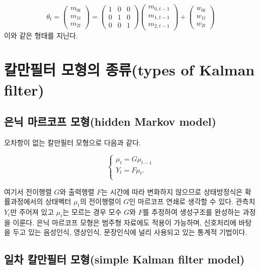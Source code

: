 \documentclass[b5paper,]{book}
\theoremstyle{definition}
\theoremstyle{definition}
\theoremstyle{definition}
\theoremstyle{remark}
\begin{document}
\[
\theta_{t} =
 \begin{pmatrix}
  m_{0t} \\
  m_{1t} \\
  m_{2t} 
 \end{pmatrix}
= 
 \begin{pmatrix}
  1 & 0 & 0 \\
  0 & 1 & 0 \\
  0 & 0 & 1
 \end{pmatrix}
 \begin{pmatrix}
  m_{0,t-1} \\
  m_{1,t-1} \\
  m_{2,t-1} 
 \end{pmatrix} 
+
 \begin{pmatrix}
  w_{0t} \\
  w_{1t} \\
  w_{2t} 
 \end{pmatrix}
\] 이와 같은 형태를 지닌다.

\section{칼만필터 모형의 종류(types of Kalman
filter)}\label{--types-of-kalman-filter}

\subsection{은닉 마르코프 모형(hidden Markov
model)}\label{--hidden-markov-model}

오차항이 없는 칼만필터 모형으로 다음과 같다.

\[
\begin{cases}
\mu_{t}=G\mu_{t-1} \\
Y_{t}=F\mu_{t}.\\
\end{cases}
\]

여기서 전이행렬 \(G\)와 출력행렬 \(F\)는 시간에 따라 변화하지 않으므로
상태방정식은 확률과정에서의 상태벡터 \(\mu_{t}\)의 전이행렬이 \(G\)인
마르코프 연쇄로 생각할 수 있다. 관측치 \(Y_{t}\)만 주어져 있고
\(\mu_{t}\)는 모르는 경우 모수 \(G\)와 \(F\)를 추정하여 생성구조를
완성하는 과정을 이룬다. 은닉 마르코프 모형은 범주형 자료에도 적용이
가능하며, 신호처리에 바탕을 두고 있는 음성인식, 영상인식, 문장인식에
널리 사용되고 있는 통계적 기법이다.

\subsection{일차 칼만필터 모형(simple Kalman filter
model)}\label{--simple-kalman-filter-model}
\end{document}
